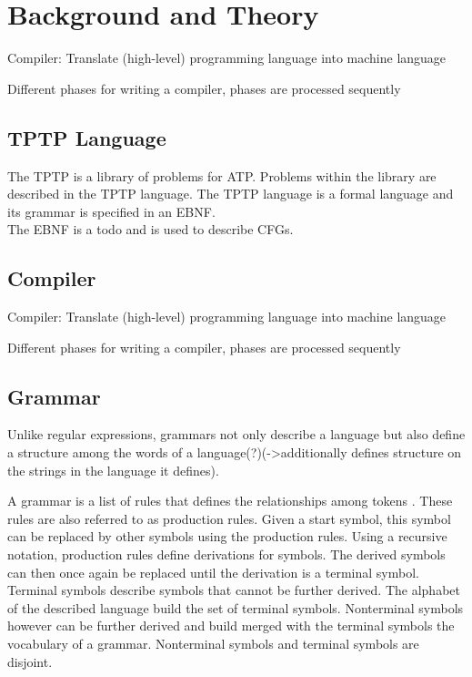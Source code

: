 
\chapter{Background and Theory}\label{cha:Background}



\cite{Mogensen.2017}
Compiler: Translate (high-level) programming language into machine language

Different phases for writing a compiler, phases are processed sequently
\section{TPTP Language}\label{sec:BackgroundTPTP}
The \acf{TPTP} is a library of problems for \ac{ATP}.
Problems within the library are described in the \ac{TPTP} language.
The  \ac{TPTP} language is a formal language and its grammar is specified in an \ac{EBNF}. \cite{Sut17}\\
The \ac{EBNF} \cite{EBNF} is a todo and is used to describe \acp{CFG}.


\section{Compiler}\label{sec:BackgroundCompiler}

\cite{Mogensen.2017}
Compiler: Translate (high-level) programming language into machine language

Different phases for writing a compiler, phases are processed sequently

\section{Grammar}\label{sec:BackgroundGrammar}

Unlike regular expressions, grammars not only describe a language but also define a structure among the words of a language(?)(->additionally defines structure on the strings in the language it defines).

A grammar is a list of rules that defines the relationships among tokens \cite{LexYacc.1992}.
These rules are also referred to as production rules.
Given a start symbol, this symbol can be replaced by other symbols using the production rules.
Using a recursive notation, production rules define derivations for symbols. The derived symbols can then once again be replaced until the derivation is a terminal symbol.  
Terminal symbols describe symbols that cannot be further derived. The alphabet of the described language build the set of terminal symbols.
Nonterminal symbols however can be further derived and build  merged with the terminal symbols the vocabulary of a grammar. Nonterminal symbols and terminal symbols are disjoint. 

